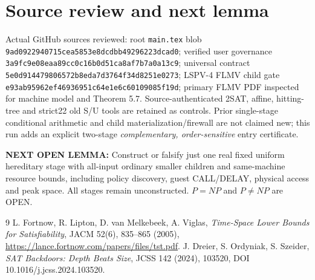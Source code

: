 \documentclass[11pt]{article}
\begin{document}
\section{Source review and next lemma}
Actual GitHub sources reviewed: root \texttt{main.tex} blob \texttt{9ad0922940715cea5853e8dcdbb49296223dcad0}; verified user governance \texttt{3a9fc9e08eaa89cc0c16b0d51ca8af7b7a0a13c9}; universal contract \texttt{5e0d914479806572b8eda7d3764f34d8251e0273}; LSPV-4 FLMV child gate \texttt{e93ab95962ef46936951c64e1e6c60109085f19d}; primary FLMV PDF inspected for machine model and Theorem 5.7. Source-authenticated 2SAT, affine, hitting-tree and strict22 old S/U tools are retained as controls. Prior single-stage conditional arithmetic and child materialization/firewall are not claimed new; this run adds an explicit two-stage \emph{complementary, order-sensitive} entry certificate.
\par\noindent\textbf{NEXT OPEN LEMMA:} Construct or falsify just one real fixed uniform hereditary stage with all-input ordinary smaller children and same-machine resource bounds, including policy discovery, guest CALL/DELAY, physical access and peak space. All stages remain unconstructed. $P=NP$ and $P\ne NP$ are OPEN.
\begin{thebibliography}{9}
 L. Fortnow, R. Lipton, D. van Melkebeek, A. Viglas, \emph{Time-Space Lower Bounds for Satisfiability}, JACM 52(6), 835--865 (2005), \url{https://lance.fortnow.com/papers/files/tst.pdf}.
 J. Dreier, S. Ordyniak, S. Szeider, \emph{SAT Backdoors: Depth Beats Size}, JCSS 142 (2024), 103520, DOI 10.1016/j.jcss.2024.103520.
\end{thebibliography}
\end{document}
